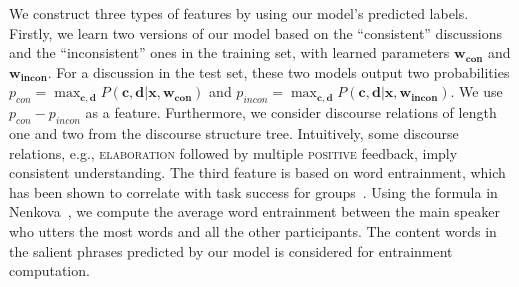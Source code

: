 We construct three types of features by using our model's predicted labels. Firstly, we learn two versions of our model based on the ``consistent'' discussions and the ``inconsistent'' ones in the training set, with learned parameters $\mathbf{w_{con}}$ and $\mathbf{w_{incon}}$. For a discussion in the test set, these two models output two probabilities $p_{con}=\max_{\mathbf{c}, \mathbf{d}} P(\mathbf{c}, \mathbf{d}|\mathbf{x}, \mathbf{w_{con}})$ and $p_{incon}=\max_{\mathbf{c}, \mathbf{d}} P(\mathbf{c}, \mathbf{d}|\mathbf{x}, \mathbf{w_{incon}})$. We use $p_{con}-p_{incon}$ as a feature. Furthermore, we consider discourse relations of length one and two from the discourse structure tree. Intuitively, some discourse relations, e.g., \textsc{elaboration} followed by multiple \textsc{positive} feedback, imply consistent understanding. The third feature is based on word entrainment, which has been shown to correlate with task success for groups~\cite{nenkova2008high}. Using the formula in Nenkova~\cite{nenkova2008high}, we compute the average word entrainment between the main speaker who utters the most words and all the other participants. The content words in the salient phrases predicted by our model is considered for entrainment computation.


